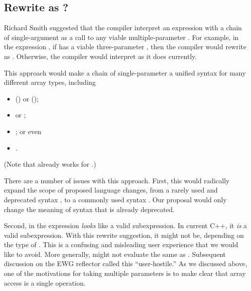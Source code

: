 \documentclass{wg21}
\begin{document}
\subsection{Rewrite \tcode{a[x][y]][z]} as ?}

Richard Smith suggested that the compiler interpret an expression with a chain of single-argument  as a call to any viable multiple-parameter .  For example, in the expression , if  has a viable three-parameter , then the compiler would rewrite  as .  Otherwise, the compiler would interpret  as it does currently.  

This approach would make a chain of single-parameter  a unified syntax for many different array types, including

\begin{itemize}
\item {} () or  ();
\item {} or ;
\item {}; or even
\item {}.
\end{itemize}

(Note that  already works for .)  

There are a number of issues with this approach.  First, this would radically expand the scope of proposed language changes, from a rarely used and deprecated syntax , to a commonly used syntax .  Our proposal would only change the meaning of syntax that is already deprecated.

Second,  in the expression  \emph{looks} like a valid subexpression.  In current C++, it \emph{is} a valid subexpression.  With this rewrite suggestion, it might not be, depending on the type of .  This is a confusing and misleading user experience that we would like to avoid.  More generally,  might not evaluate the same as .  Subsequent discussion on the EWG reflector called this ``user-hostile.''  As we discussed above, one of the motivations for  taking multiple parameters is to make clear that array access is a single operation.
\end{document}
